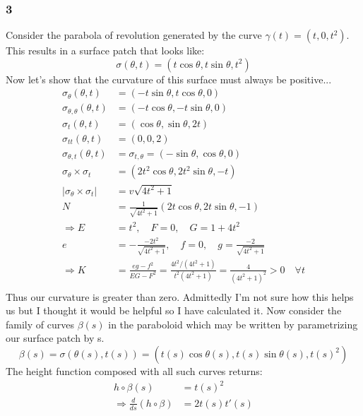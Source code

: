 \documentclass[a4paper, 11pt]{article}
\begin{document}
	\subsubsection*{3}
	Consider the parabola of revolution generated by the curve $\gamma(t) = (t, 0 , t^2)$. This results in a surface patch that looks like: 
		\begin{equation*}
			\sigma(\theta, t) = (t\cos\theta, t\sin\theta, t^2) 
		\end{equation*}
	Now let's show that the curvature of this surface must always be positive... 
		\begin{align*}
			\sigma_\theta(\theta,t) &= (-t\sin\theta, t\cos\theta, 0) \\ 
			\sigma_{\theta,\theta}(\theta,t)&= (-t\cos\theta, -t\sin\theta, 0) \\ 
			\sigma_{t}(\theta, t) &= (\cos\theta, \sin\theta, 2t) \\ 
			\sigma_{tt}(\theta, t) &= (0 , 0, 2)\\ 
			\sigma_{\theta,t}(\theta, t) &= \sigma_{t,\theta} = (-\sin\theta, \cos\theta, 0) \\ 
			\sigma_\theta \times \sigma_t &= (2t^2\cos\theta, 2t^2\sin\theta, -t) \\
			|\sigma_\theta \times \sigma_t| &= v\sqrt{4t^2+1} \\ 
			N &= \frac{1}{\sqrt{4t^2+1}}(2t\cos\theta, 2t\sin\theta, -1) \\ 
			\Rightarrow E &= t^2, \quad F= 0, \quad G = 1+4t^2 \\ 
			e &= -\frac{-2t^2}{\sqrt{4t^2+1}}, \quad f = 0, \quad g = \frac{-2}{\sqrt{4t^2+1}} \\ 
			\Rightarrow K &= \frac{eg-f^2}{EG-F^2} = \frac{4t^2/(4t^2+1)}{t^2(4t^2+1)} = \frac{4}{(4t^2+1)^2} >0 \quad \forall t\\
		\end{align*}
	Thus our curvature is greater than zero. Admittedly I'm not sure how this helps us but I thought it would be helpful so I have calculated it. Now consider the family of curves $\beta(s)$ in the paraboloid which may be written by parametrizing our surface patch by s.
		\begin{equation*}
			\beta(s) = \sigma(\theta(s), t(s)) = (t(s)\cos\theta(s), t(s)\sin\theta(s), t(s)^2) 
		\end{equation*}
	The height function composed with all such curves returns: 
		\begin{align*}
			h\circ\beta(s) &= t(s)^2 \\ 
			\Rightarrow \frac{d}{ds}(h\circ\beta) &= 2t(s)t'(s) 
		\end{align*}
\end{document}
